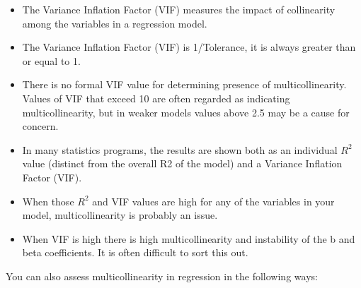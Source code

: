 \documentclass[a4paper,12pt]{article}
\begin{document}
\begin{itemize}
	\item The Variance Inflation Factor (VIF) measures the impact of collinearity among the variables in a regression model. 
	\item The Variance Inflation Factor (VIF) is 1/Tolerance, it is always greater than or equal to 1. 
	\item There is no formal VIF value for determining presence of multicollinearity. Values of VIF that exceed 10 are often regarded as indicating multicollinearity, but in weaker models values above 2.5 may be a cause for concern. 
	\item In many statistics programs, the results are shown both as an individual $R^2$ value (distinct from the overall R2 of the model) and a Variance Inflation Factor (VIF). 
	\item When those $R^2$ and VIF values are high for any of the variables in your model, multicollinearity is probably an issue. 
	\item When VIF is high there is high multicollinearity and instability of the b and beta coefficients. It is often difficult to sort this out. 
\end{itemize}


\bigskip

You can also assess multicollinearity in regression in the following ways:
\end{document}
